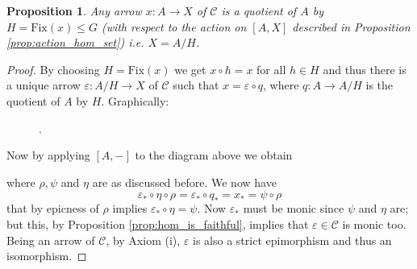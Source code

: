 \documentclass[italian, 12pt, reqno]{article}
\theoremstyle{myteo}
\newtheorem{proposition}[theorem]{Proposition}
\numberwithin{equation}{section}
\newcommand{\cat}[1]{\mathscr{#1}}
\newcommand{\fix}[1]{\text{Fix}(#1)}
\newcommand{\homs}[2]{[#1, #2]}
\newcommand{\fun}[3]{#1\colon#2\to #3}
\begin{document}
\begin{proposition}
  \label{prop:epsilon_iso}
  Any arrow \(\fun{x}{A}{X}\) of \(\cat{C}\) is a quotient of \(A\) by \(H = \fix{x}\leq G\) (with respect to the action on \(\homs{A}{X}\) described in Proposition \ref{prop:action_hom_set}) i.e. \(X = A/H\).
\end{proposition}

\begin{proof}
  By choosing \(H = \fix{x}\) we get \(x\circ h = x\) for all \(h\in H\) and thus there is a unique arrow \(\fun{\varepsilon}{A/H}{X}\) of \(\cat{C}\) such that \(x = \varepsilon\circ q\), where \(\fun{q}{A}{A/H}\) is the quotient of \(A\) by \(H\).
  Graphically:

  \begin{figure}
    \begin{center}
      .
    \end{center}
    \caption{}
    \label{diagram:varepsilon}
  \end{figure}

  Now by applying \(\homs{A}{-}\) to the diagram above we obtain

  \begin{figure}
    \begin{center}
    \end{center}
    \caption{}
    \label{diagram:big_diagram}
  \end{figure}
  where \(\rho, \psi\) and \(\eta\) are as discussed before.
  We now have
  \[\varepsilon_*\circ \eta\circ\rho = \varepsilon_*\circ q_* = x_* = \psi\circ \rho\]
  that by epicness of \(\rho\) implies \(\varepsilon_*\circ \eta = \psi\).
  Now \(\varepsilon_*\) must be monic since \(\psi\) and \(\eta\) are; but this, by Proposition \ref{prop:hom_is_faithful}, implies that \(\varepsilon\in\cat{C}\) is monic too.
  Being an arrow of \(\cat{C}\), by Axiom (i), \(\varepsilon\) is also a strict epimorphism and thus an isomorphism.
\end{proof}
\end{document}
